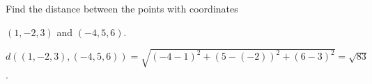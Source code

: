 \begin{frame}

\begin{example}
Find the distance between the points with coordinates 

$(1,-2,3)$ and $(-4,5,6)$.

\pause 

$d((1,-2,3),  (-4,5,6))= \sqrt{(-4-1)^2+(5-(-2))^2+(6-3)^2}= \sqrt{83}$.
\end{example}
\end{frame}